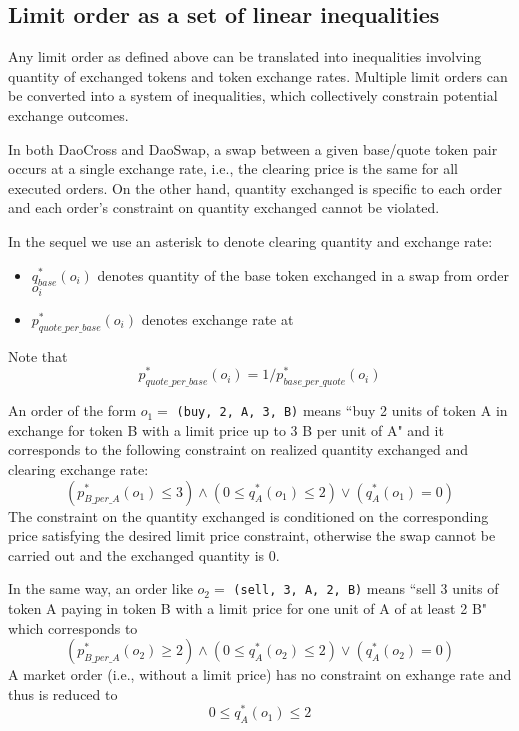\documentclass[11pt, reqno]{amsart}
\newcommand{\buy}{\textnormal{\texttt{buy}}}
\begin{document}
\subsection{Limit order as a set of linear inequalities}
Any limit order as defined above can be translated into inequalities involving
quantity of exchanged tokens and token exchange rates. Multiple limit orders
can be converted into a system of inequalities, which collectively constrain
potential exchange outcomes.

In both DaoCross and DaoSwap, a swap between a given base/quote token pair
occurs at a single exchange rate, i.e., the clearing price is the same for
all executed orders. On the other hand, quantity exchanged is specific to
each order and each order's constraint on quantity exchanged cannot be
violated.

In the sequel we use an asterisk to denote clearing quantity and exchange
rate:
\begin{itemize}
	\item $q_{base}^*(o_i)$ denotes quantity of the base token exchanged in a
	      swap from order $o_i$
	\item $p_{quote\_per\_base}^*(o_i)$ denotes exchange rate at
\end{itemize}
Note that
\[
	p_{quote\_per\_base}^*(o_i) =
	1 / p_{base\_per\_quote}^*(o_i)
\]

An order of the form $o_1 =$ \texttt{(\buy, 2, A, 3, B)} means ``buy 2 units of
token A in exchange for token B with a limit price up to 3 B per unit of A"
and it corresponds to the following constraint on realized quantity exchanged
and clearing exchange rate:
\begin{equation*}
	(p_{B\_per\_A}^*(o_1) \leq 3) \land
	(0 \le q_{A}^*(o_1) \leq 2) \lor
	(q_A^*(o_1) = 0)
\end{equation*}
The constraint on the quantity exchanged is conditioned on the corresponding
price satisfying the desired limit price constraint, otherwise the swap cannot
be carried out and the exchanged quantity is 0.

In the same way, an order like $o_2 =$ \texttt{(sell, 3, A, 2, B)} means ``sell
3 units of token A paying in token B with a limit price for one unit of A of at
least 2 B" which corresponds to
\begin{equation*}
	(p_{B\_per\_A}^*(o_2) \geq 2) \land
	(0 \le q_{A}^*(o_2) \leq 2) \lor
	(q_A^*(o_2) = 0)
\end{equation*}
A market order (i.e., without a limit price) has no constraint on exhange rate
and thus is reduced to
\[
	0 \le q_{A}^*(o_1) \le 2
\]
\end{document}
